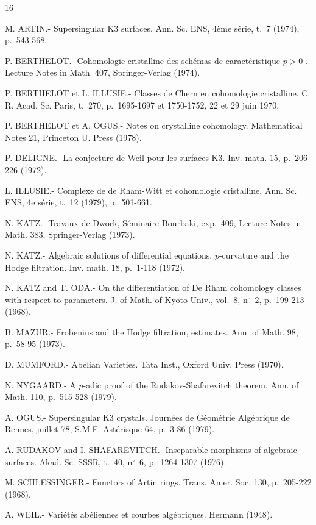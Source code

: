 \documentclass[10pt]{article}
\begin{document}
\renewcommand{\refname}{\centering BIBLIOGRAPHY}
\begin{thebibliography}{16}\setlength{\itemsep}{0.35em}
\par{} M. ARTIN.- Supersingular K3 surfaces. Ann. Sc. ENS, 4ème série, t.~7 (1974), p.~543-568.
\par{} P. BERTHELOT.- Cohomologie cristalline des schémas de caractéristique $p>0$ . Lecture Notes in Math. 407, Springer-Verlag (1974).
\par{} P. BERTHELOT et L. ILLUSIE.- Classes de Chern en cohomologie cristalline. C. R. Acad. Sc. Paris, t.~270, p.~1695-1697 et 1750-1752, 22 et 29 juin 1970.
\par{} P. BERTHELOT et A. OGUS.- Notes on crystalline cohomology. Mathematical Notes 21, Princeton U. Press (1978).
\par{} P. DELIGNE.- La conjecture de Weil pour les surfaces K3. Inv. math. 15, p.~206-226 (1972).
\par{} L. ILLUSIE.- Complexe de de Rham-Witt et cohomologie cristalline, Ann. Sc. ENS, 4e série, t.~12 (1979), p.~501-661.
\par{} N. KATZ.- Travaux de Dwork, Séminaire Bourbaki, exp.~409, Lecture Notes in Math. 383, Springer-Verlag (1973).
\par{} N. KATZ.- Algebraic solutions of differential equations, $p$-curvature and the Hodge filtration. Inv. math. 18, p.~1-118 (1972).
\par{} N. KATZ and T. ODA.- On the differentiation of De Rham cohomology classes with respect to parameters. J. of Math. of Kyoto Univ., vol.~8, n$^\circ$~2, p.~199-213 (1968).
\par{} B. MAZUR.- Frobenius and the Hodge filtration, estimates. Ann. of Math. 98, p.~58-95 (1973).
\par{} D. MUMFORD.- Abelian Varieties. Tata Inst., Oxford Univ. Press (1970).
\par{} N. NYGAARD.- A $p$-adic proof of the Rudakov-Shafarevitch theorem. Ann. of Math. 110, p.~515-528 (1979).
\par{} A. OGUS.- Supersingular K3 crystals. Journées de Géométrie Algébrique de Rennes, juillet 78, S.M.F. Astérisque 64, p.~3-86 (1979).
\par{} A. RUDAKOV and I. SHAFAREVITCH.- Inseparable morphisms of algebraic surfaces. Akad. Sc. SSSR, t.~40, n$^\circ$~6, p.~1264-1307 (1976).
\par{} M. SCHLESSINGER.- Functors of Artin rings. Trans. Amer. Soc. 130, p.~205-222 (1968).
\par{} A. WEIL.- Variétés abéliennes et courbes algébriques. Hermann (1948).
\end{thebibliography}
\vfill
\end{document}
